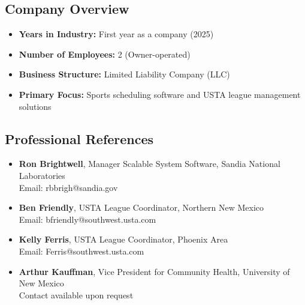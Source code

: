 \subsection*{Company Overview}
\begin{itemize}
    \item \textbf{Years in Industry:} First year as a company (2025)
    \item \textbf{Number of Employees:} 2 (Owner-operated)
    \item \textbf{Business Structure:} Limited Liability Company (LLC)
    \item \textbf{Primary Focus:} Sports scheduling software and USTA league management solutions
\end{itemize}


\subsection*{Professional References}
\begin{itemize}
    \item \textbf{Ron Brightwell}, Manager Scalable System Software, Sandia National Laboratories\\
    Email: rbbrigh@sandia.gov
    \item \textbf{Ben Friendly}, USTA League Coordinator, Northern New Mexico\\
    Email: bfriendly@southwest.usta.com
    \item \textbf{Kelly Ferris}, USTA League Coordinator, Phoenix Area \\
    Email: Ferris@southwest.usta.com
    \item \textbf{Arthur Kauffman}, Vice President for Community Health, University of New Mexico\\
    Contact available upon request
\end{itemize}